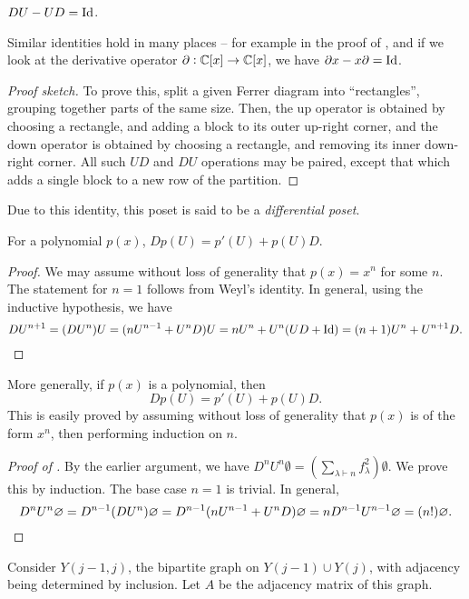 \begin{flem}
	$DU - UD = \Id$.
\end{flem}
Similar identities hold in many places -- for example in the proof of , and if we look at the derivative operator $\partial : \C[x] \to \C[x]$, we have $\partial x - x \partial = \Id$.
\begin{proof}[Proof sketch]
	To prove this, split a given Ferrer diagram into ``rectangles'', grouping together parts of the same size. Then, the up operator is obtained by choosing a rectangle, and adding a block to its outer up-right corner, and the down operator is obtained by choosing a rectangle, and removing its inner down-right corner. All such $UD$ and $DU$ operations may be paired, except that which adds a single block to a new row of the partition.
\end{proof}

Due to this identity, this poset is said to be a \emph{differential poset}.
\begin{fcor}
	For a polynomial $p(x)$, $Dp(U) = p'(U) + p(U)D$.
\end{fcor}
\begin{proof}
	We may assume without loss of generality that $p(x) = x^n$ for some $n$. The statement for $n=1$ follows from Weyl's identity. In general, using the inductive hypothesis, we have
	\[ DU^{n+1} = (DU^n)U = (nU^{n-1} + U^nD)U = nU^{n} + U^n(UD+\Id) = (n+1)U^n + U^{n+1}D. \]
\end{proof}

More generally, if $p(x)$ is a polynomial, then
\[ Dp(U) = p'(U) + p(U)D. \]
This is easily proved by assuming without loss of generality that $p(x)$ is of the form $x^n$, then performing induction on $n$.

\begin{proof}[Proof of ]
	By the earlier argument, we have $D^nU^n \emptyset = \left(\sum_{\lambda \vdash n} f_\lambda^2\right) \emptyset$. We prove this by induction. The base case $n=1$ is trivial. In general,
	\[ D^nU^n \emptyset = D^{n-1}(DU^n) \emptyset = D^{n-1}(nU^{n-1} + U^nD)\emptyset = n D^{n-1}U^{n-1} \emptyset = (n!) \emptyset. \qedhere \]
\end{proof}

Consider $Y(j-1,j)$, the bipartite graph on $Y(j-1) \cup Y(j)$, with adjacency being determined by inclusion. Let $A$ be the adjacency matrix of this graph.


